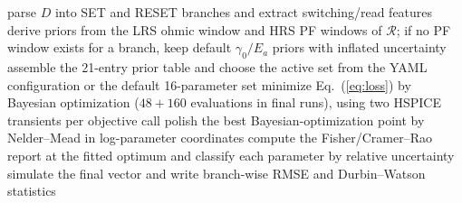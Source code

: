 \documentclass[journal]{IEEEtran}
\begin{document}
\begin{algorithm}[!t]
\caption{Physics-guided, identifiability-aware Stanford parameter extraction}
\label{alg:fit}
\footnotesize
{}
parse $D$ into SET and RESET branches and extract switching/read features\;
derive priors from the LRS ohmic window and HRS PF windows of $\mathcal{R}$;
if no PF window exists for a branch, keep default $\gamma_0/E_a$ priors with
inflated uncertainty\;
assemble the 21-entry prior table and choose the active set from the YAML
configuration or the default 16-parameter set\;
minimize Eq.~(\ref{eq:loss}) by Bayesian optimization
($48+160$ evaluations in final runs), using two HSPICE transients per
objective call\;
polish the best Bayesian-optimization point by Nelder--Mead in log-parameter
coordinates\;
compute the Fisher/Cramer--Rao report at the fitted optimum and classify each
parameter by relative uncertainty\;
simulate the final vector and write branch-wise RMSE and Durbin--Watson
statistics\;
\end{algorithm}
\end{document}
